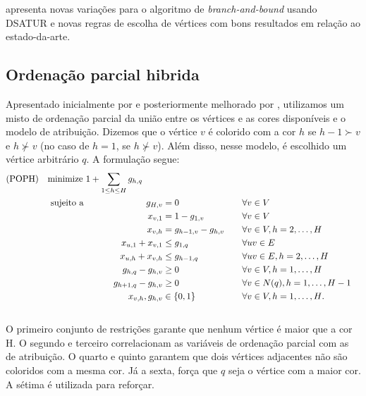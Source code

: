 \documentclass[11pt]{article}
\begin{document}
\textcite{Ternier2017ExactAlgorithmsVertex} apresenta novas variações para o algoritmo de \emph{branch-and-bound} usando DSATUR e novas regras de escolha de vértices com bons resultados em relação ao estado-da-arte.
\subsection{Ordenação parcial hibrida}
\label{sec:org6a7c530}
Apresentado inicialmente por \autocite{Jabrayilov2018NewIntegerLinear} e posteriormente melhorado por \autocite{Jabrayilov2022StrengthenedPartialOrdering}, utilizamos um misto de ordenação parcial da união entre os vértices e as cores disponíveis e o modelo de atribuição.
Dizemos que o vértice \(v\) é colorido com a cor \(h\) se \(h-1 \succ v\) e \(h \nsucc v\) (no caso de \(h=1\), se \(h \nsucc v\)). 
Além disso, nesse modelo, é escolhido um vértice arbitrário \(q\).
A formulação segue:
\begin{alignat*}
\mathrm { (POPH) } \quad & \omit\rlap{minimize  $\displaystyle 1+\sum_{1 \leq h \leq H} g_{h, q}$} \\
& \mbox { sujeito a } && \quad & g_{H, v} &=0          & \quad & \forall v \in V \\
&                     &&   & x_{v, 1} &=1-g_{1, v} & \quad & \forall v \in V \\
&                     &&   & x_{v, h} &=g_{h-1, v}-g_{h, v} & \quad & \forall v \in V, h=2, \ldots, H \\
&                     &&   & x_{u, 1}+x_{v, 1} &\leq g_{1, q} & \quad & \forall u v \in E \\
&                     &&   & x_{u, h}+x_{v, h} &\leq g_{h-1, q} & \quad & \forall u v \in E, h=2, \ldots, H \\
&                     &&   & g_{h, q}-g_{h, v} &\geq 0 & \quad & \forall v \in V, h=1, \ldots, H \\
&                     &&   & g_{h+1, q}-g_{h, v} &\geq 0 & \quad & \forall v \in N(q), h=1, \ldots, H-1 \\
&                     &&   & x_{v, h}, g_{h, v} &\in\{0,1\} & \quad & \forall v \in V, h=1, \ldots, H \text {. } \\
&                     &&   &
\end{alignat*}
O primeiro conjunto de restrições garante que nenhum vértice é maior que a cor H.
O segundo e terceiro correlacionam as variáveis de ordenação parcial com as de atribuição.
O quarto e quinto garantem que dois vértices adjacentes não são coloridos com a mesma cor.
Já a sexta, força que \(q\) seja o vértice com a maior cor.
A sétima é utilizada para reforçar.
\end{document}
